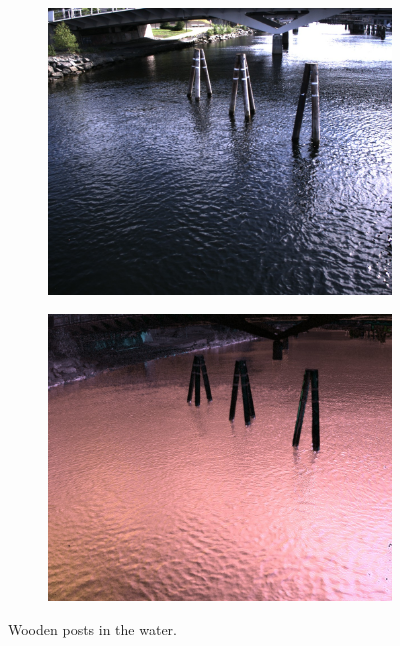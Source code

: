 \begin{figure}[H]
    \begin{subfigure}[T]{.49\textwidth}
        \includegraphics[width=\textwidth]{figures/pictures/img_7458_s0.jpg}
    \end{subfigure} \hfill
    \begin{subfigure}[T]{.49\textwidth}
        \includegraphics[width=\textwidth]{figures/pictures/img_7458_pol.jpg}

    \end{subfigure}
    \caption{Wooden posts in the water.}
\end{figure}
\vspace{-.5cm}

